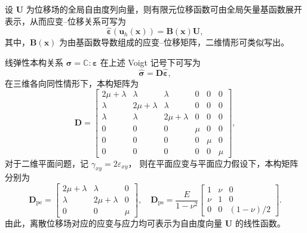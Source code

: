 设 $\boldsymbol{U}$ 为位移场的全局自由度列向量，则有限元位移函数可由全局矢量基函数展开表示，从而应变–位移关系可写为
\[
\hat{\boldsymbol{\varepsilon}}(\boldsymbol{u}_h(\boldsymbol{x})) = \boldsymbol{B}(\boldsymbol{x})\boldsymbol{U},
\]
其中，$\boldsymbol{B}(\boldsymbol{x})$ 为由基函数导数组成的应变–位移矩阵，二维情形可类似写出。

线弹性本构关系  $\boldsymbol{\sigma} = \mathbb{C}:\boldsymbol{\varepsilon}$ 在上述 Voigt 记号下可写为
\[
\hat{\boldsymbol{\sigma}} = \boldsymbol{D}\hat{\boldsymbol{\varepsilon}},
\]
在三维各向同性情形下，本构矩阵为
\[
\boldsymbol{D} =
\begin{bmatrix}
	2\mu+\lambda &\lambda &\lambda &0 &0 &0\\
	\lambda &2\mu+\lambda &\lambda &0 &0 &0\\
	\lambda &\lambda &2\mu+\lambda &0 &0 &0\\
	0 &0 &0 &\mu &0 &0\\
	0 &0 &0 & 0 &\mu &0\\
	0 &0 &0 &0 &0 &\mu
\end{bmatrix},
\]
对于二维平面问题，记 $\gamma_{xy} = 2\varepsilon_{xy}$，
则在平面应变与平面应力假设下，本构矩阵分别为
\[
\boldsymbol{D}_{\text{pe}} = 
\begin{bmatrix}
	2\mu + \lambda & \lambda & 0 \\
	\lambda & 2\mu + \lambda & 0 \\
	0 & 0 & \mu
\end{bmatrix},\quad
\boldsymbol{D}_{\text{ps}} = \frac{E}{1-\nu^2}
\begin{bmatrix}
	1 &\nu &0\\
	\nu &1 &0\\
	0 &0 &(1-\nu)/2
\end{bmatrix}.
\]
由此，离散位移场对应的应变与应力均可表示为自由度向量 $\boldsymbol{U}$ 的线性函数。

